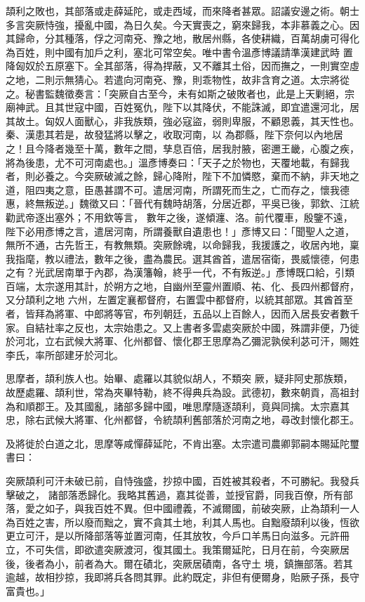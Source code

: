 \begin{pinyinscope}
 頡利之敗也，其部落或走薛延陀，或走西域，而來降者甚眾。詔議安邊之術。朝士多言突厥恃強，擾亂中國，為日久矣。今天實喪之，窮來歸我，本非慕義之心。因其歸命，分其種落，俘之河南兗、豫之地，散居州縣，各使耕織，百萬胡虜可得化為百姓，則中國有加戶之利，塞北可常空矣。唯中書令溫彥博議請準漢建武時
 置降匈奴於五原塞下。全其部落，得為捍蔽，又不離其土俗，因而撫之，一則實空虛之地，二則示無猜心。若遣向河南兗、豫，則乖物性，故非含育之道。太宗將從之。秘書監魏徵奏言：「突厥自古至今，未有如斯之破敗者也，此是上天剿絕，宗廟神武。且其世寇中國，百姓冤仇，陛下以其降伏，不能誅滅，即宜遣還河北，居其故土。匈奴人面獸心，非我族類，強必寇盜，弱則卑服，不顧恩義，其天性也。秦、漢患其若是，故發猛將以擊之，收取河南，以
 為郡縣，陛下奈何以內地居之！且今降者幾至十萬，數年之間，孳息百倍，居我肘腋，密邇王畿，心腹之疾，將為後患，尤不可河南處也。」溫彥博奏曰：「天子之於物也，天覆地載，有歸我者，則必養之。今突厥破滅之餘，歸心降附，陛下不加憐愍，棄而不納，非天地之道，阻四夷之意，臣愚甚謂不可。遣居河南，所謂死而生之，亡而存之，懷我德惠，終無叛逆。」魏徵又曰：「晉代有魏時胡落，分居近郡，平吳已後，郭欽、江統勸武帝逐出塞外；不用欽等言，
 數年之後，遂傾瀍、洛。前代覆車，殷鑒不遠，陛下必用彥博之言，遣居河南，所謂養獸自遺患也！」彥博又曰：「聞聖人之道，無所不通，古先哲王，有教無類。突厥餘魂，以命歸我，我援護之，收居內地，稟我指麾，教以禮法，數年之後，盡為農民。選其酋首，遣居宿衛，畏威懷德，何患之有？光武居南單于內郡，為漢籓翰，終乎一代，不有叛逆。」彥博既口給，引類百端，太宗遂用其計，於朔方之地，自幽州至靈州置順、祐、化、長四州都督府，又分頡利之地
 六州，左置定襄都督府，右置雲中都督府，以統其部眾。其酋首至者，皆拜為將軍、中郎將等官，布列朝廷，五品以上百餘人，因而入居長安者數千家。自結社率之反也，太宗始患之。又上書者多雲處突厥於中國，殊謂非便，乃徙於河北，立右武候大將軍、化州都督、懷化郡王思摩為乙彌泥孰侯利苾可汗，賜姓李氏，率所部建牙於河北。



 思摩者，頡利族人也。始畢、處羅以其貌似胡人，不類突
 厥，疑非阿史那族類，故歷處羅、頡利世，常為夾畢特勒，終不得典兵為設。武德初，數來朝貢，高祖封為和順郡王。及其國亂，諸部多歸中國，唯思摩隨逐頡利，竟與同擒。太宗嘉其忠，除右武候大將軍、化州都督，令統頡利舊部落於河南之地，尋改封懷化郡王。



 及將徙於白道之北，思摩等咸憚薛延陀，不肯出塞。太宗遣司農卿郭嗣本賜延陀璽書曰：



 突厥頡利可汗未破已前，自恃強盛，抄掠中國，百姓被其殺者，不可勝紀。我發兵擊破之，
 諸部落悉歸化。我略其舊過，嘉其從善，並授官爵，同我百僚，所有部落，愛之如子，與我百姓不異。但中國禮義，不滅爾國，前破突厥，止為頡利一人為百姓之害，所以廢而黜之，實不貪其土地，利其人馬也。自黜廢頡利以後，恆欲更立可汗，是以所降部落等並置河南，任其放牧，今戶口羊馬日向滋多。元許冊立，不可失信，即欲遣突厥渡河，復其國土。我策爾延陀，日月在前，今突厥居後，後者為小，前者為大。爾在磧北，突厥居磧南，各守土
 境，鎮撫部落。若其逾越，故相抄掠，我即將兵各問其罪。此約既定，非但有便爾身，貽厥子孫，長守富貴也。」




\end{pinyinscope}
